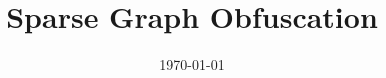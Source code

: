 \documentclass[11pt]{article}
\newcommand{\myname}{Lev Stambler}
\begin{document}
\title{Sparse Graph Obfuscation}




\date{\today}
\maketitle

\begin{abstract}
\end{abstract}



\end{document}
